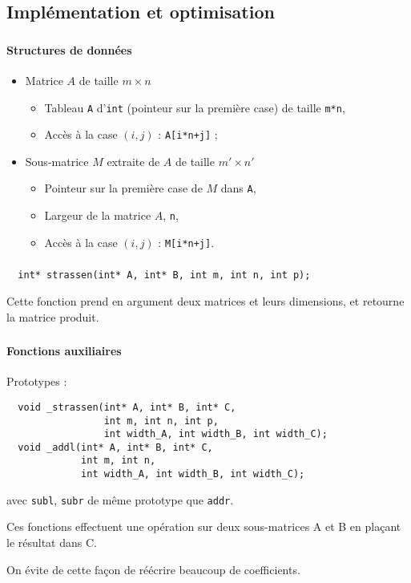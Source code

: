 \documentclass{beamer}
\begin{document}
\subsection{Implémentation et optimisation}
\begin{frame}[fragile]
  \frametitle{\insertsubsection}
  \framesubtitle{Structures de données}
  \begin{itemize}
    \item Matrice $A$ de taille $m\times n$
    \begin{itemize}
      \item Tableau \verb=A= d'\verb=int=
      (pointeur sur la première case) de taille \verb=m*n=,
      \item Accès à la case $(i,j)$ : \verb=A[i*n+j]= ;
    \end{itemize}
    \item<2-> Sous-matrice $M$ extraite de $A$ de taille $m'\times n'$
    \begin{itemize}
      \item Pointeur sur la première case de $M$ dans \verb=A=,
      \item Largeur de la matrice $A$, \verb=n=,
      \item Accès à la case $(i,j)$ : \verb=M[i*n+j]=.
    \end{itemize}
  \end{itemize}
\end{frame}

\begin{frame}[fragile]
  \frametitle{\insertsubsection}
  \small
  \begin{verbatim}
  int* strassen(int* A, int* B, int m, int n, int p);
  \end{verbatim}\normalsize
  Cette fonction prend en argument deux matrices et leurs dimensions,
  et retourne la matrice produit.
\end{frame}

\begin{frame}[fragile]
  \frametitle{\insertsubsection}
  \framesubtitle{Fonctions auxiliaires}
  Prototypes :
  \small\begin{verbatim}
  void _strassen(int* A, int* B, int* C,
                 int m, int n, int p,
                 int width_A, int width_B, int width_C);
  void _addl(int* A, int* B, int* C,
             int m, int n,
             int width_A, int width_B, int width_C);
  \end{verbatim}\normalsize
  avec \verb=subl=, \verb=subr= de même prototype que \verb=addr=.

  Ces fonctions effectuent une opération sur deux sous-matrices A et B
  en plaçant le résultat dans C.

  On évite de cette façon de réécrire beaucoup de coefficients.
\end{frame}
\end{document}
